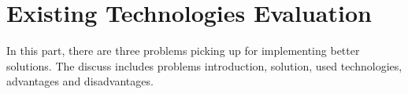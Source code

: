 \section{Existing Technologies Evaluation}

In this part, there are three problems picking up for implementing better solutions. The discuss includes problems introduction, solution, used technologies, advantages and disadvantages.